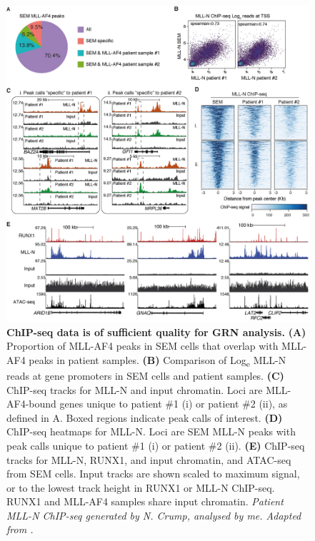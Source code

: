 \begin{figure}[htbp]
    \centering
    \includegraphics[width=\textwidth,keepaspectratio]{figures/chapter4/ch4_peak-qc.png}
    \caption[{ChIP-seq data is of sufficient quality for GRN analysis.}]
    {\textbf{ChIP-seq data is of sufficient quality for GRN analysis.} 
    \textbf{(A)} Proportion of MLL-AF4 peaks in SEM cells that overlap with MLL-AF4 peaks in patient samples. 
    \textbf{(B)} Comparison of Log\textsubscript{e} MLL-N reads at gene promoters in SEM cells and patient samples. 
    \textbf{(C)} ChIP-seq tracks for MLL-N and input chromatin. Loci are MLL-AF4-bound genes unique to patient \#1 (i) or patient \#2 (ii), as defined in A. Boxed regions indicate peak calls of interest. 
    \textbf{(D)} ChIP-seq heatmaps for MLL-N. Loci are SEM MLL-N peaks with peak calls unique to patient \#1 (i) or patient \#2 (ii). 
    \textbf{(E)} ChIP-seq tracks for MLL-N, RUNX1, and input chromatin, and ATAC-seq from SEM cells. Input tracks are shown scaled to maximum signal, or to the lowest track height in RUNX1 or MLL-N ChIP-seq. RUNX1 and MLL-AF4 samples share input chromatin. 
    \textit{Patient MLL-N ChIP-seq generated by N. Crump, analysed by me. Adapted from \cite{harman_kmt2a-aff1_2021}.}
    }
    \label{fig:ch4_peak-qc}
\end{figure}

